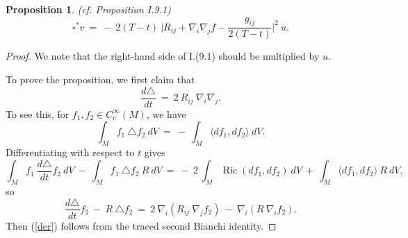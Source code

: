 \documentclass[12pt]{amsart}
\newcommand{\Ric}{\operatorname{Ric}}
\numberwithin{equation}{section}
\theoremstyle{plain}
\newtheorem{proposition}[equation]{Proposition}
\theoremstyle{definition}
\theoremstyle{remark}
\begin{document}
\begin{proposition} (cf. Proposition I.9.1) \label{localized}
\begin{equation} \label{I.(9.1)}
\square^*v \: = \: - \: 2(T-t) \: \Big| R_{ij} + \nabla_i \nabla_j f - \frac{g_{ij}}{2(T-t)}
\Big|^2 \: u.
\end{equation}
\end{proposition}
\begin{proof}
We note that the right-hand side of I.(9.1) should be multiplied by $u$.

To prove the proposition, we first claim that 
\begin{equation} \label{der}
\frac{d\triangle}{dt} \: = \: 2 \: R_{ij} \: \nabla_i \nabla_j.
\end{equation}
To see this, for $f_1, f_2 \in C^\infty_c(M)$, we have
\begin{equation}
\int_M f_1 \: \triangle f_2 \: dV \: = \: - \:
\int_M \langle df_1, df_2 \rangle \: dV.
\end{equation}
Differentiating with respect to $t$ gives
\begin{equation}
\int_M f_1 \: \frac{d\triangle}{dt} f_2 \: dV \: - \:
\int_M f_1 \: \triangle f_2 \: R \: dV
\: = \: - \: 2 \:
\int_M \Ric(df_1, df_2) \: dV
\: + \: \int_M \langle df_1, df_2 \rangle \: R \: dV,
\end{equation}
so
\begin{equation}
\frac{d\triangle}{dt} f_2 \: - \:
R \: \triangle f_2
\: = \: 2 \: \nabla_i (R_{ij} \: \nabla_j f_2)
\: - \: \nabla_i (R \:  \nabla_i f_2).
\end{equation}
Then (\ref{der}) follows from the traced second Bianchi identity.


\end{proof}
\end{document}
